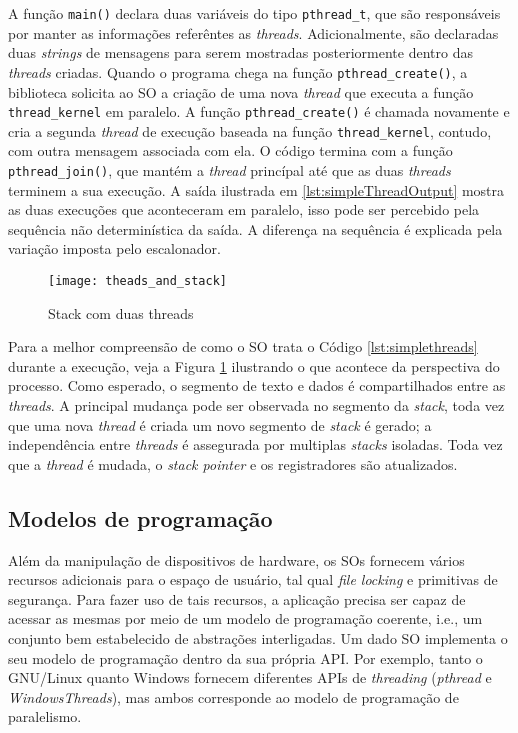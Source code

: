 A função \texttt{main()} declara duas variáveis do tipo \texttt{pthread\_t}, que
são responsáveis por manter as informações referêntes as \emph{threads}.
Adicionalmente, são declaradas duas \emph{strings} de mensagens para serem
mostradas posteriormente dentro das \emph{threads} criadas. Quando o programa
chega na função \texttt{pthread\_create()}, a biblioteca solicita ao SO a
criação de uma nova \emph{thread} que executa a função \texttt{thread\_kernel}
em paralelo. A função \texttt{pthread\_create()} é chamada novamente e cria a segunda
\emph{thread} de execução baseada na função \texttt{thread\_kernel}, contudo,
com outra mensagem associada com ela. O código termina com a função
\texttt{pthread\_join()}, que mantém a \emph{thread} princípal até que as duas
\emph{threads} terminem a sua execução. A saída ilustrada em
\ref{lst:simpleThreadOutput} mostra as duas execuções que aconteceram em
paralelo, isso pode ser percebido pela sequência não determinística da saída. A
diferença na sequência é explicada pela variação imposta pelo escalonador.

\begin{figure}[!h]
  \centering
  \texttt{[image: theads\_and\_stack]} 
  \caption{Stack com duas threads}
  \label{fig:stack_threads} 
\end{figure}

Para a melhor compreensão de como o SO trata o Código \ref{lst:simplethreads}
durante a execução, veja a Figura \ref{fig:stack_threads} ilustrando o que
acontece da perspectiva do processo. Como esperado, o segmento de texto e dados
é compartilhados entre as \emph{threads}. A principal mudança pode ser
observada no segmento da \emph{stack}, toda vez que uma nova \emph{thread} é
criada um novo segmento de \emph{stack} é gerado; a independência entre
\emph{threads} é assegurada por multiplas \emph{stacks} isoladas. Toda vez que
a \emph{thread} é mudada, o \emph{stack pointer} e os registradores são
atualizados.

\subsection{Modelos de programação}

Além da manipulação de dispositivos de hardware, os SOs fornecem vários
recursos adicionais para o espaço de usuário, tal qual \emph{file locking} e
primitivas de segurança. Para fazer uso de tais recursos, a aplicação precisa
ser capaz de acessar as mesmas por meio de um modelo de programação coerente,
i.e., um conjunto bem estabelecido de abstrações interligadas. Um dado SO
implementa o seu modelo de programação dentro da sua própria API. Por exemplo,
tanto o GNU/Linux quanto Windows fornecem diferentes APIs de \emph{threading}
(\emph{pthread} e \emph{WindowsThreads}), mas ambos corresponde ao modelo de
programação de paralelismo.

